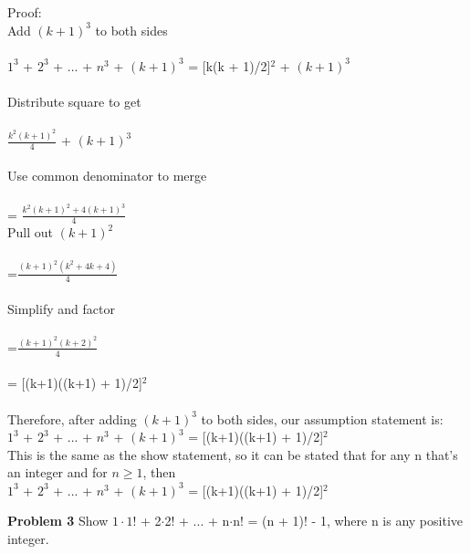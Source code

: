 \documentclass[12pt]{article}
\begin{document}
Proof: \\
	Add $(k + 1)^{3}$ to both sides \\
	\\
	 $1^{3}$ + $2^{3}$ + ... + $n^{3}$ + $(k + 1)^{3}$ = [k(k + 1)/2]$^{2}$ + $(k + 1)^{3}$ \\
	 \\
	 Distribute square to get\\
	 \\
	 $\frac{k^{2}(k+1)^{2}}{4}$ + $(k+1)^{3}$\\
	 \\
	 Use common denominator to merge \\
	 \\
	 = $\frac{k^{2}(k+1)^{2} + 4(k+1)^{3}}{4}$
	 \\
	 Pull out $(k + 1)^{2}$\\
	 \\
	 =$\frac{(k+1)^{2}(k^{2}+4k+4)}{4}$ \\
	 \\
	 Simplify and factor \\
	 \\
	 =$\frac{(k+1)^{2}(k+2)^{2}}{4}$ \\
	 \\
	 = [(k+1)((k+1) + 1)/2]$^{2}$ \\
	 \\
	 Therefore, after adding $(k + 1)^{3}$ to both sides, our assumption statement is: \\
	 $1^{3}$ + $2^{3}$ + ... + $n^{3}$ + $(k+1)^{3}$ = [(k+1)((k+1) + 1)/2]$^{2}$  \\
	 This is the same as the show statement, so it can be stated that for any n that's an integer
	 and for $n\geq1$, then \\
	 $1^{3}$ + $2^{3}$ + ... + $n^{3}$ + $(k+1)^{3}$ = [(k+1)((k+1) + 1)/2]$^{2}$


\par

\par
\bigskip
{\bf Problem
3
}
Show $1\cdot1$! + 2$\cdot$2! + ... + n$\cdot$n! = (n + 1)! - 1, where n is any positive integer.
\end{document}
